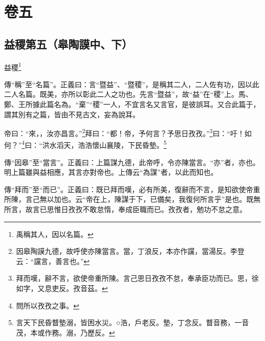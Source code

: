 

\chapter{卷五}


\section{益稷第五（皋陶謨中、下）}


益稷\footnote{禹稱其人，因以名篇。}

{\noindent\zhuan{}\fzbyks 傳“稱”至“名篇”。正義曰：言“暨益”、“暨稷”，是稱其二人，二人佐有功，因以此二人名篇。既美，亦所以彰此二人之功也。先言“暨益”，故“益”在“稷”上。馬、鄭、王所據此篇名為。“棄”“稷”一人，不宜言名又言官，是彼誤耳。又合此篇于，謂其別有之篇，皆由不見古文，妄為說耳。 \par}

帝曰：“來，，汝亦昌言。”\footnote{因皋陶謨九德，故呼使亦陳當言。當，丁浪反，本亦作讜，當湯反。李登云：“讜言，善言也。”}拜曰：“都！帝，予何言？予思日孜孜。”\footnote{拜而嘆，辭不言，欲使帝重所陳。言己思日孜孜不怠，奉承臣功而已。思，徐如字，又息吏反。孜音茲。}曰：“吁！如何？”\footnote{問所以孜孜之事。}曰：“洪水滔天，浩浩懷山襄陵，下民昏墊。\footnote{言天下民昏瞀墊溺，皆困水災。○浩，戶老反。墊，丁念反。瞀音務，一音茂，本或作務。溺，乃歷反。}


{\noindent\zhuan{}\fzbyks 傳“因皋”至“當言”。正義曰：上篇謀九德，此帝呼，令亦陳當言。“亦”者，亦也。明上篇雖與益相應，其言亦對帝也。上傳云“為謀”者，以此而知也。 \par}

{\noindent\zhuan{}\fzbyks 傳“拜而”至“而已”。正義曰：既已拜而嘆，必有所美，復辭而不言，是知欲使帝重所陳，言己無以加也。云“帝在上，陳謀于下，已備矣，我復何所言乎”是也。既無所言，故言已思惟日孜孜不敢怠惰，奉成臣職而已。孜孜者，勉功不怠之意。 \par}

